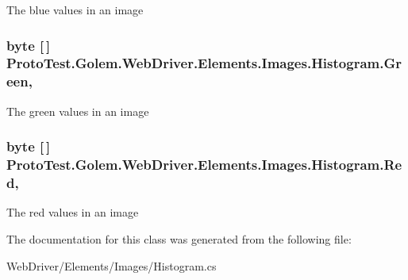 The blue values in an image 

\hypertarget{class_proto_test_1_1_golem_1_1_web_driver_1_1_elements_1_1_images_1_1_histogram_a585d3b0381034e08dc6192eb332ae13d}{
\subsubsection[{Green}]{\setlength{\rightskip}{0pt plus 5cm}byte \mbox{[}$\,$\mbox{]} Proto\-Test.\-Golem.\-Web\-Driver.\-Elements.\-Images.\-Histogram.\-Green\hspace{0.3cm}{\ttfamily [get]}, {\ttfamily [set]}}}\label{class_proto_test_1_1_golem_1_1_web_driver_1_1_elements_1_1_images_1_1_histogram_a585d3b0381034e08dc6192eb332ae13d}


The green values in an image 

\hypertarget{class_proto_test_1_1_golem_1_1_web_driver_1_1_elements_1_1_images_1_1_histogram_a1526e0e844601560be71b8f186ccaf08}{
\subsubsection[{Red}]{\setlength{\rightskip}{0pt plus 5cm}byte \mbox{[}$\,$\mbox{]} Proto\-Test.\-Golem.\-Web\-Driver.\-Elements.\-Images.\-Histogram.\-Red\hspace{0.3cm}{\ttfamily [get]}, {\ttfamily [set]}}}\label{class_proto_test_1_1_golem_1_1_web_driver_1_1_elements_1_1_images_1_1_histogram_a1526e0e844601560be71b8f186ccaf08}


The red values in an image 



The documentation for this class was generated from the following file\-:\begin{DoxyCompactItemize}
\item 
Web\-Driver/\-Elements/\-Images/Histogram.\-cs\end{DoxyCompactItemize}
